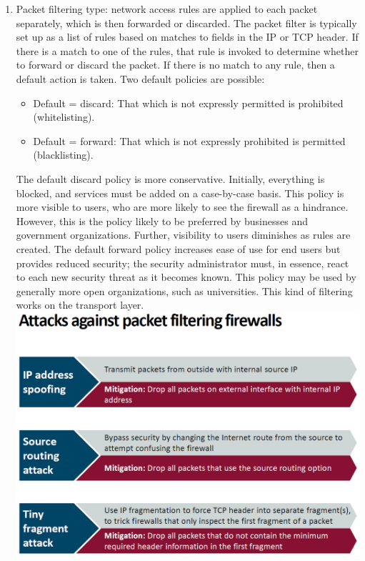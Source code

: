 \documentclass[12pt]{article}
\begin{document}
 \begin{enumerate}
 	\item Packet filtering type: network access rules are applied to each packet separately, which is then forwarded or discarded. The packet filter is typically set up as a list of rules based on matches to fields in the IP or TCP header. If there is a match to one of the rules, that rule is invoked to determine whether to forward or discard the packet. If there is no match to any rule, then a	default action is taken. Two default policies are possible:
 	\begin{itemize}
 		\item Default = discard: That which is not expressly permitted is prohibited (whitelisting).
 		\item Default = forward: That which is not expressly prohibited is permitted (blacklisting).
 	\end{itemize}
 	The default discard policy is more conservative. Initially, everything is blocked, and services must be added on a case-by-case basis. This policy is more visible to users, who are more likely to see the firewall as a hindrance. However, this is the policy likely to be preferred by businesses and government organizations. Further, visibility to users diminishes as rules are created. The default forward policy increases ease of use for	end users but provides reduced security; the security administrator must, in essence, react to each new security threat as it becomes known. This policy may be used by	generally more open organizations, such as universities. This kind of filtering works on the transport layer.\\
 	\includegraphics[width=\linewidth]{./slides/L6P3F1ATT.PNG}

\end{enumerate}
\end{document}
